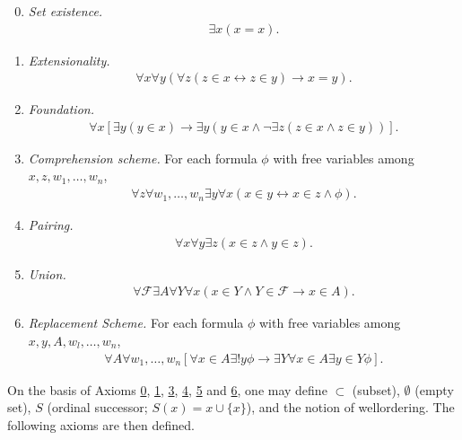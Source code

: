 \documentclass[manuscript]{BSLstyle} %
\begin{document}
\begin{fact}
	\begin{enumerate}[label=\textsc{Axiom} \arabic*., align=left, leftmargin=\parindent]
		\setcounter{enumi}{-1}
		\item\label{ax::0} \textit{Set existence.}
		\begin{align*}
			\exists x(x=x).
		\end{align*}
		\item\label{ax::1} \textit{Extensionality.}
		\begin{align*}
		\forall x\forall y(\forall z(z\in x\leftrightarrow z\in y)\to x=y).
		\end{align*}
		\item\label{ax::2} \textit{Foundation.}
		\begin{align*}
		\forall x[\exists y(y\in x)\to\exists y(y\in x\land\neg\exists z(z\in x\land z\in y))].
		\end{align*}
		\item\label{ax::3} \textit{Comprehension scheme.} For each formula $\phi$ with free variables among $x,z,w_1,\ldots,w_n$,
		\begin{align*}
		\forall z\forall w_1,\ldots,w_n\exists y\forall x(x\in y\leftrightarrow x\in z\land\phi).
		\end{align*}
		\item\label{ax::4} \textit{Pairing.}
		\begin{align*}
		\forall x\forall y\exists z(x\in z\land y\in z).
		\end{align*}
		\item\label{ax::5} \textit{Union.}
		\begin{align*}
		\forall\mathscr{F}\exists A\forall Y\forall x(x\in Y\land Y\in\mathscr{F}\to x\in A).
		\end{align*}
		\item\label{ax::6} \textit{Replacement Scheme.} For each formula $\phi$ with free variables among $x, y, A, w_l,\ldots,w_n$,
		\begin{align*}
		\forall A\forall w_1,\ldots,w_n[\forall x\in A\exists!y\phi\to\exists Y\forall x\in A\exists y\in Y\phi].
		\end{align*}
	\end{enumerate}
On the basis of Axioms \href{ax::0}{0}, \href{ax::1}{1}, \href{ax::3}{3}, \href{ax::4}{4}, \href{ax::5}{5} and \href{ax::6}{6}, one may define $\subset$ (subset), $\emptyset$ (empty set), $S$ (ordinal successor; $S(x) = x \cup \{x\}$), and the notion of wellordering. The following axioms are then defined.

\end{fact}
\end{document}
